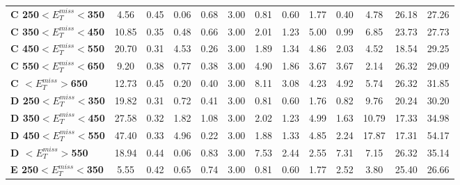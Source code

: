 \begin{table}[h]
\begin{center}
{\begin{tabular}{|l|cccccccccccc|}
\textbf{ C 250$<E_T^{miss}<$350}         & 4.56          & 0.45          & 0.06          & 0.68          & 3.00          & 0.81          & 0.60          & 1.77          & 0.40          & 4.78          & 26.18         & 27.26         \\
\textbf{ C 350$<E_T^{miss}<$450}         & 10.85         & 0.35          & 0.48          & 0.66          & 3.00          & 2.01          & 1.23          & 5.00          & 0.99          & 6.85          & 23.73         & 27.73         \\
\textbf{ C 450$<E_T^{miss}<$550}         & 20.70         & 0.31          & 4.53          & 0.26          & 3.00          & 1.89          & 1.34          & 4.86          & 2.03          & 4.52          & 18.54         & 29.25         \\
\textbf{ C 550$<E_T^{miss}<$650}         & 9.20          & 0.38          & 0.77          & 0.38          & 3.00          & 4.90          & 1.86          & 3.67          & 3.67          & 2.14          & 26.32         & 29.09         \\
\textbf{ C $<E_T^{miss}>$650}    & 12.73         & 0.45          & 0.20          & 0.40          & 3.00          & 8.11          & 3.08          & 4.23          & 4.92          & 5.74          & 26.32         & 31.85         \\
\textbf{ D 250$<E_T^{miss}<$350}         & 19.82         & 0.31          & 0.72          & 0.41          & 3.00          & 0.81          & 0.60          & 1.76          & 0.82          & 9.76          & 20.24         & 30.20         \\
\textbf{ D 350$<E_T^{miss}<$450}         & 27.58         & 0.32          & 1.82          & 1.08          & 3.00          & 2.02          & 1.23          & 4.99          & 1.63          & 10.79         & 17.33         & 34.98         \\
\textbf{ D 450$<E_T^{miss}<$550}         & 47.40         & 0.33          & 4.96          & 0.22          & 3.00          & 1.88          & 1.33          & 4.85          & 2.24          & 17.87         & 17.31         & 54.17         \\
\textbf{ D $<E_T^{miss}>$550}    & 18.94         & 0.44          & 0.06          & 0.83          & 3.00          & 7.53          & 2.44          & 2.55          & 7.31          & 7.15          & 26.32         & 35.14         \\
\textbf{ E 250$<E_T^{miss}<$350}         & 5.55          & 0.42          & 0.65          & 0.74          & 3.00          & 0.81          & 0.60          & 1.77          & 2.52          & 3.80          & 25.40         & 26.66         \\

\end{tabular}}
\end{center}
\end{table}
